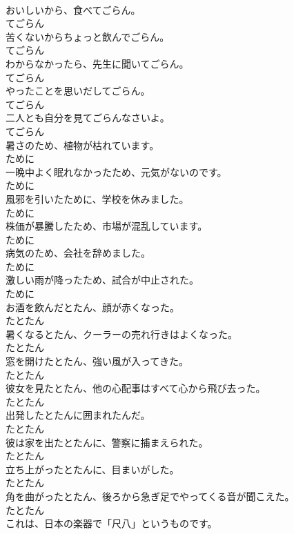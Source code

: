\documentclass[8pt]{extreport}
\begin{document}
\begin{CJK}{UTF8}{min}
\\	おいしいから、食べてごらん。	
\\	てごらん
\\	苦くないからちょっと飲んでごらん。	
\\	てごらん
\\	わからなかったら、先生に聞いてごらん。	
\\	てごらん
\\	やったことを思いだしてごらん。	
\\	てごらん
\\	二人とも自分を見てごらんなさいよ。	
\\	てごらん
\\	暑さのため、植物が枯れています。	
\\	ために
\\	一晩中よく眠れなかったため、元気がないのです。	
\\	ために
\\	風邪を引いたために、学校を休みました。	
\\	ために
\\	株価が暴騰したため、市場が混乱しています。	
\\	ために
\\	病気のため、会社を辞めました。	
\\	ために
\\	激しい雨が降ったため、試合が中止された。	
\\	ために
\\	お酒を飲んだとたん、顔が赤くなった。	
\\	たとたん
\\	暑くなるとたん、クーラーの売れ行きはよくなった。	
\\	たとたん
\\	窓を開けたとたん、強い風が入ってきた。	
\\	たとたん
\\	彼女を見たとたん、他の心配事はすべて心から飛び去った。	
\\	たとたん
\\	出発したとたんに囲まれたんだ。	
\\	たとたん
\\	彼は家を出たとたんに、警察に捕まえられた。	
\\	たとたん
\\	立ち上がったとたんに、目まいがした。	
\\	たとたん
\\	角を曲がったとたん、後ろから急ぎ足でやってくる音が聞こえた。	
\\	たとたん
\\	これは、日本の楽器で「尺八」というものです。	

\end{CJK}
\end{document}
